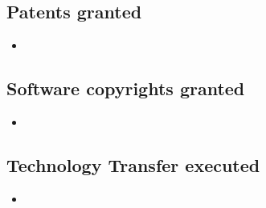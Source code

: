 \documentclass[12pt,A4paper]{article}
\begin{document}
\subsection*{Patents granted}
     \begin{itemize}     
        \item
    \end{itemize}
\subsection*{Software copyrights granted}
     \begin{itemize}     
        \item
    \end{itemize}
\subsection*{Technology Transfer
executed}
     \begin{itemize}     
        \item
    \end{itemize}

 \newpage
{}
\renewcommand\refname{Selected References}





\end{document}
